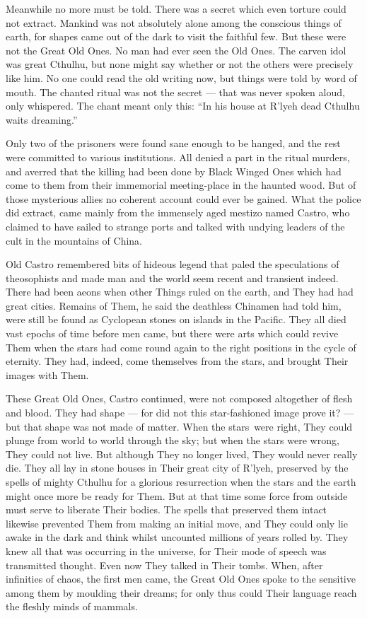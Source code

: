 Meanwhile no more must be told. There was a secret which even torture
could not extract. Mankind was not absolutely alone among the conscious
things of earth, for shapes came out of the dark to visit the faithful
few. But these were not the Great Old Ones. No man had ever seen the Old
Ones. The carven idol was great Cthulhu, but none might say whether or
not the others were precisely like him. No one could read the old
writing now, but things were told by word of mouth. The chanted ritual
was not the secret --- that was never spoken aloud, only whispered. The
chant meant only this: ``In his house at R'lyeh dead Cthulhu waits
dreaming.''

\pagebreak

Only two of the prisoners were found sane enough to be hanged, and the
rest were committed to various institutions. All denied a part in the
ritual murders, and averred that the killing had been done by Black
Winged Ones which had come to them from their immemorial meeting-place
in the haunted wood. But of those mysterious allies no coherent account
could ever be gained. What the police did extract, came mainly from the
immensely aged mestizo named Castro, who claimed to have sailed to
strange ports and talked with undying leaders of the cult in the
mountains of China.

Old Castro remembered bits of hideous legend that paled the speculations
of theosophists and made man and the world seem recent and transient
indeed. There had been aeons when other Things ruled on the earth, and
They had had great cities. Remains of Them, he said the deathless
Chinamen had told him, were still be found as Cyclopean stones on
islands in the Pacific. They all died vast epochs of time before men
came, but there were arts which could revive Them when the stars had
come round again to the right positions in the cycle of eternity. They
had, indeed, come themselves from the stars, and brought Their images
with Them.

These Great Old Ones, Castro continued, were not composed altogether of
flesh and blood. They had shape --- for did not this star-fashioned image
prove it? --- but that shape was not made of matter. When the stars\est\ were
right, They could plunge from world to world through the sky; but when
the stars were wrong, They could not live. But although They no longer
lived, They would never really die. They all lay in stone houses in
Their great city of R'lyeh, preserved by the spells of mighty Cthulhu
for a glorious resurrection when the stars and the earth might once more
be ready for Them. But at that time some force from outside must serve
to liberate Their bodies. The spells that preserved them intact likewise
prevented Them from making an initial move, and They could only lie
awake in the dark and think whilst uncounted millions of years rolled
by. They knew all that was occurring in the universe, for Their mode of
speech was transmitted thought. Even now They talked in Their tombs.
When, after infinities of chaos, the first men came, the Great Old Ones
spoke to the sensitive among them by moulding their dreams; for only
thus could Their language reach the fleshly minds of mammals.

